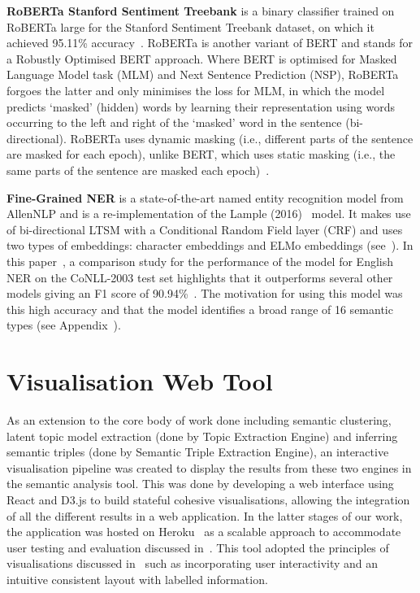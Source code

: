 \textbf{RoBERTa Stanford Sentiment Treebank} is a binary classifier trained on RoBERTa large for the Stanford Sentiment Treebank dataset, on which it achieved 95.11\% accuracy~\cite{roberta}. RoBERTa is another variant of BERT and stands for a Robustly Optimised BERT approach. Where BERT is optimised for Masked Language Model task (MLM) and Next Sentence Prediction (NSP), RoBERTa forgoes the latter and only minimises the loss for MLM, in which the model predicts `masked' (hidden) words by learning their representation using words occurring to the left and right of the `masked' word in the sentence (bi-directional). RoBERTa uses dynamic masking (i.e., different parts of the sentence are masked for each epoch), unlike BERT, which uses static masking (i.e., the same parts of the sentence are masked each epoch)~\cite{roberta}. 

\textbf{Fine-Grained NER} is a state-of-the-art named entity recognition model from AllenNLP and is a re-implementation of the Lample (2016)~\cite{lample} model. It makes use of bi-directional LTSM with a Conditional Random Field layer (CRF) and uses two types of embeddings: character embeddings and ELMo embeddings (see~). In this paper~\cite{lample}, a comparison study for the performance of the model for English NER on the CoNLL-2003 test set highlights that it outperforms several other models giving an F1 score of 90.94\%~\cite{lample}. The motivation for using this model was this high accuracy and that the model identifies a broad range of 16 semantic types (see Appendix~).

\section{Visualisation Web Tool}
As an extension to the core body of work done including semantic clustering, latent topic model extraction (done by Topic Extraction Engine) and inferring semantic triples (done by Semantic Triple Extraction Engine), an interactive visualisation pipeline was created to display the results from these two engines in the semantic analysis tool. 
This was done by developing a web interface using React and D3.js to build stateful cohesive visualisations, allowing the integration of all the different results in a web application. In the latter stages of our work, the application was hosted on Heroku~\cite{heroku} as a scalable approach to accommodate user testing and evaluation discussed in~. This tool adopted the principles of visualisations discussed in~ such as incorporating user interactivity and an intuitive consistent layout with labelled information.